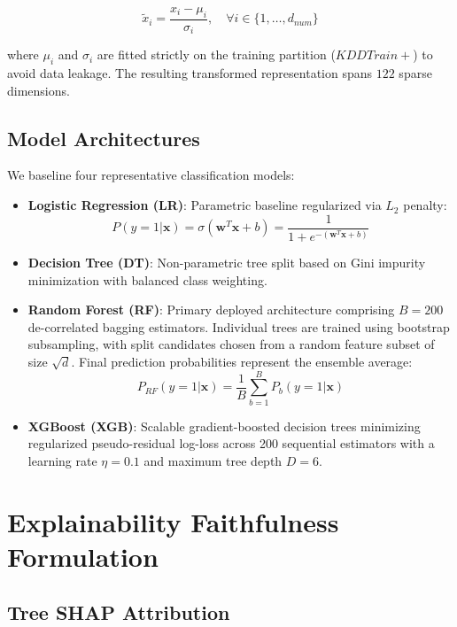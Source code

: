 \documentclass[conference]{IEEEtran}
\begin{document}
\begin{equation}
\tilde{x}_i = \frac{x_i - \mu_i}{\sigma_i}, \quad \forall i \in \{1, \dots, d_{num}\}
\end{equation}

where $\mu_i$ and $\sigma_i$ are fitted strictly on the training partition ($KDDTrain+$) to avoid data leakage. The resulting transformed representation spans $122$ sparse dimensions.

\subsection{Model Architectures}

We baseline four representative classification models:

\begin{itemize}
    \item \textbf{Logistic Regression (LR)}: Parametric baseline regularized via $L_2$ penalty:
    \begin{equation}
    P(y=1|\mathbf{x}) = \sigma(\mathbf{w}^T \mathbf{x} + b) = \frac{1}{1 + e^{-(\mathbf{w}^T \mathbf{x} + b)}}
    \end{equation}
    \item \textbf{Decision Tree (DT)}: Non-parametric tree split based on Gini impurity minimization with balanced class weighting.
    \item \textbf{Random Forest (RF)}: Primary deployed architecture comprising $B=200$ de-correlated bagging estimators. Individual trees are trained using bootstrap subsampling, with split candidates chosen from a random feature subset of size $\sqrt{d}$. Final prediction probabilities represent the ensemble average:
    \begin{equation}
    P_{RF}(y=1|\mathbf{x}) = \frac{1}{B} \sum_{b=1}^B P_b(y=1|\mathbf{x})
    \end{equation}
    \item \textbf{XGBoost (XGB)}: Scalable gradient-boosted decision trees minimizing regularized pseudo-residual log-loss across 200 sequential estimators with a learning rate $\eta = 0.1$ and maximum tree depth $D=6$.
\end{itemize}

\section{Explainability Faithfulness Formulation}

\subsection{Tree SHAP Attribution}
\end{document}
